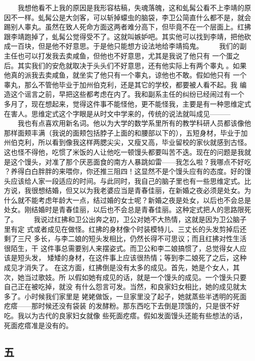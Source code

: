  　　我想他看不上我的原因是我形容枯稿，失魂落魄，这和虬髯公看不上李靖的原 因不一样。虬髯公是大剑客，可以斩掉蠓虫的脑袋，李卫公简直什么都不是，就会 踢别人睾丸。虽然在致人死命方面这两者难分高下，但毕竟不在一个层面上。红拂 跟李靖跑掉了，虬髯公觉得受不了。这就叫嫉妒吧。其实他可以找到李靖，把他砍 成一百块，但是他不好意思。于是他只能想方设法地给李靖捣鬼。 　　我们的副主任也可以打发我去卖咸鱼，但他也不好意思，尤其是我说了他只有 一个蛋之后。其实我们的安危就取决于头头们不好意思，还有他实际上有两个睾丸 。如果他真的派我去卖咸鱼，就坐实了他只有一个睾丸，谅他也不敢。假如他只有 一个睾丸，那么不管他毕业于加州伯克利，还是其它的学校，都要被人看不起。我 编造这个谣言之前，早把这些都考虑在内了。我和副系主任的纠纷已经闹过有一个 多月了，现在想起来，觉得这件事不能怪他，更不能怪我，主要是有一种思维定式 在害人。思维定式这个字眼是从时文中学来的，传统的说法就叫成见——— 　　我也有点喜欢用新名词。他以为大学的数学系里所有的教学科研人员都该像他 那样面颊丰满（我说的面颊包括脖子上面的和腰部以下的），五短身材，毕业于加 州伯克利，所以看到像我这样两腮尖尖，又瘦又高，毕业留校的家伙就感到古怪。 这也怪不得他，吃惯了米饭的人让他吃一顿馒头都要叫苦不迭。现在的问题是我就 是这个馒头，对准了那个厌恶面食的南方人暴跳如雷——我怎么啦？我哪点不好吃 ？养得白白胖胖的来喂你，你还推三阻四！这显然不是个馒头应有的态度。好的馒 头应该给人家一段适应的时间。与此同时，我自己的脑子里也有一些思维定式。比 方说，我很想结婚，但又以为我老婆应当是青春佳丽，在新婚之夜必须是处女。为 什么就不能考虑年龄大一点，结过婚的女士呢？新婚之夜是处女，以后也不会总是 处女。刚结婚时是青春佳丽，以后也不会总是青春佳丽。这种定式把人的思路限死 了。 　　我说过红拂和卫公出奔之初，卫公对她不大热情，这就是因为卫公脑子里有定 式或者成见在做怪。红拂的身材像个时装模特儿、三丈长的头发剪掉后还剩了三尺 多长，与李二娘的短头发相比，仍然长得不可思议；而且红拂对性生活很陌生，干 这件事总需要别人来摆姿式。而卫公和李二娘搞惯了，总觉得女人应该是短头发， 矮矮的身材，在这件事上应该很热情；等到李二娘死了之后，这种成见才消失了。 在这方面，红拂倒是没有太多的成见。首先，她是个女人，其次，她当过歌妓。所 以假如她有成见的话，就是一个馒头的成见。一个馒头只要自己正在被吃掉，就没 有什么怨言可发。当然，和良家妇女相比，她的成见就太多了。小时候我们家里是 姥姥做饭，一旦家里没了起子，她就蒸些半透明的死面疙瘩——那时候还没有袋装 的发酵粉。那东西吃下去倒是顶饿的，只是很不好吃。我以为古代的良家妇女就像 些死面疙瘩。假如发面馒头还能有些想法的话，死面疙瘩准是没有的。 
 
 
\subsection{五} 
 
